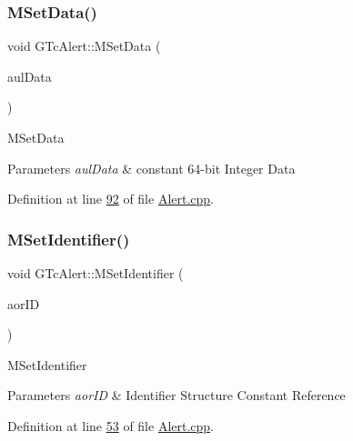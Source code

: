 \subsubsection{\texorpdfstring{M\+Set\+Data()}{MSetData()}}
{\footnotesize\ttfamily void G\+Tc\+Alert\+::\+M\+Set\+Data (\begin{DoxyParamCaption}\item[{const \mbox{\hyperlink{namespace_g_n_common_a9404ee6090c788ae70aebd1436ceb97d}{Tu64}}}]{aul\+Data }\end{DoxyParamCaption})}

M\+Set\+Data 
\begin{DoxyParams}{Parameters}
{\em aul\+Data} & constant 64-\/bit Integer Data \\
\hline
\end{DoxyParams}


Definition at line \mbox{\hyperlink{_alert_8cpp_source_l00092}{92}} of file \mbox{\hyperlink{_alert_8cpp_source}{Alert.\+cpp}}.

\mbox{\label{class_g_n_common_1_1_g_n_notification_1_1_g_tc_alert_af2bfda50c172681df26c8d1fd060c853}} 
\subsubsection{\texorpdfstring{M\+Set\+Identifier()}{MSetIdentifier()}}
{\footnotesize\ttfamily void G\+Tc\+Alert\+::\+M\+Set\+Identifier (\begin{DoxyParamCaption}\item[{const \mbox{\hyperlink{class_g_n_common_1_1_g_n_notification_1_1_g_tc_identifier}{G\+Tc\+Identifier}} \&}]{aor\+ID }\end{DoxyParamCaption})}

M\+Set\+Identifier 
\begin{DoxyParams}{Parameters}
{\em aor\+ID} & Identifier Structure Constant Reference \\
\hline
\end{DoxyParams}


Definition at line \mbox{\hyperlink{_alert_8cpp_source_l00053}{53}} of file \mbox{\hyperlink{_alert_8cpp_source}{Alert.\+cpp}}.

